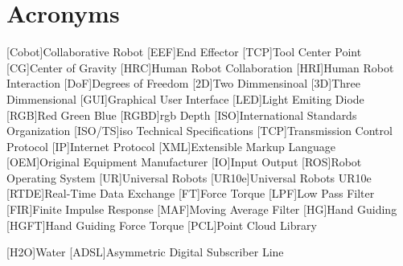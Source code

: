 \chapter{Acronyms}

\footnotesize
\SingleSpacing

\begin{multicols}{2}
\begin{acronym}[AAAAAA]

    [Cobot]{Collaborative Robot}
    [EEF]{End Effector}
    [TCP]{Tool Center Point}
    [CG]{Center of Gravity}
    [HRC]{Human Robot Collaboration}
    [HRI]{Human Robot Interaction}
    [DoF]{Degrees of Freedom}
    [2D]{Two Dimmensinoal}
    [3D]{Three Dimmensional}
    [GUI]{Graphical User Interface}
    [LED]{Light Emiting Diode}
    [RGB]{Red Green Blue}
    [RGBD]{\acs{rgb} Depth}
    [ISO]{International Standards Organization}
    [ISO/TS]{\acs{iso} Technical Specifications}
    [TCP]{Transmission Control Protocol}
    [IP]{Internet Protocol}
    [XML]{Extensible Markup Language}
    [OEM]{Original Equipment Manufacturer}
    [IO]{Input Output}
    [ROS]{Robot Operating System}
    [UR]{Universal Robots}
    [UR10e]{Universal Robots UR10e}
    [RTDE]{Real-Time Data Exchange}
    [FT]{Force Torque}
    [LPF]{Low Pass Filter}
    [FIR]{Finite Impulse Response}
    [MAF]{Moving Average Filter}
    [HG]{Hand Guiding}
    [HGFT]{Hand Guiding Force Torque}
    [PCL]{Point Cloud Library}

	[H2O]{Water}
	[ADSL]{Asymmetric Digital Subscriber Line}

\end{acronym}
\end{multicols}


